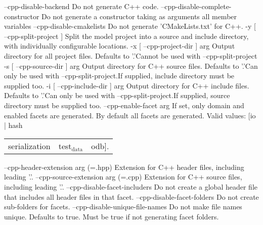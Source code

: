 \documentclass[11pt]{article}
\begin{document}
--cpp-disable-backend                 Do not generate C++ code.
--cpp-disable-complete-constructor    Do not generate a constructor taking as
                                      arguments all member variables
--cpp-disable-cmakelists              Do not generate 'CMakeLists.txt' for
                                      C++.
-y [ --cpp-split-project ]            Split the model project into a source
                                      and include directory, with
                                      individually configurable locations.
-x [ --cpp-project-dir ] arg          Output directory for all project files.
                                      Defaults to '.'Cannot be used with
                                      --cpp-split-project
-s [ --cpp-source-dir ] arg           Output directory for C++ source files.
                                      Defaults to '.'Can only be used with
                                      --cpp-split-project.If supplied,
                                      include directory must be supplied too.
-i [ --cpp-include-dir ] arg          Output directory for C++ include files.
                                      Defaults to '.'Can only be used with
                                      --cpp-split-project.If supplied, source
                                      directory must be supplied too.
--cpp-enable-facet arg                If set, only domain and enabled facets
                                      are generated. By default all facets
                                      are generated. Valid values: [io | hash
\begin{center}
\begin{tabular}{lll}
serialization & test$_{\text{data}}$ & odb].\\
\end{tabular}
\end{center}
--cpp-header-extension arg (=.hpp)    Extension for C++ header files,
                                      including leading '.'.
--cpp-source-extension arg (=.cpp)    Extension for C++ source files,
                                      including leading '.'.
--cpp-disable-facet-includers         Do not create a global header file that
                                      includes all header files in that
                                      facet.
--cpp-disable-facet-folders           Do not create sub-folders for facets.
--cpp-disable-unique-file-names       Do not make file names unique. Defaults
                                      to true. Must be true if not generating
                                      facet folders.
\end{document}
